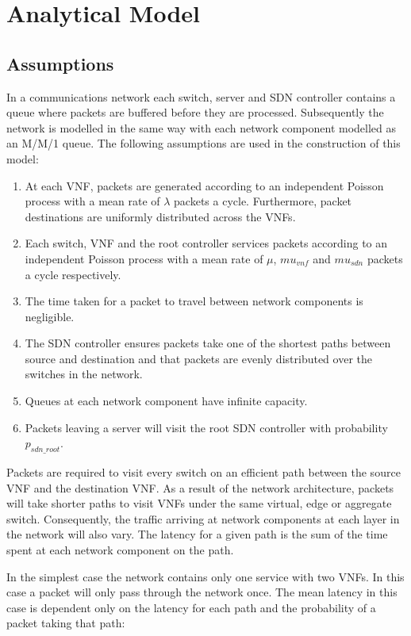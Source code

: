 
\section{Analytical Model}
\label{sec:analytical_model}

\subsection{Assumptions}
In a communications network each switch, server and SDN controller contains a queue where packets are buffered before they are processed. Subsequently the network is modelled in the same way with each network component modelled as an M/M/1 queue. The following assumptions are used in the construction of this model:

\begin{enumerate}
\item At each VNF, packets are generated according to an independent Poisson process with a mean rate of $\lambda$ packets a cycle. Furthermore, packet destinations are uniformly distributed across the VNFs.
\item Each switch, VNF and the root controller services packets according to an independent Poisson process with a mean rate of $\mu$, $mu_{vnf}$ and $mu_{sdn}$ packets a cycle respectively.
\item The time taken for a packet to travel between network components is negligible.
\item The SDN controller ensures packets take one of the shortest paths between source and destination and that packets are evenly distributed over the switches in the network.
\item Queues at each network component have infinite capacity.
\item Packets leaving a server will visit the root SDN controller with probability $p_{sdn\_root}$.
\end{enumerate}

Packets are required to visit every switch on an efficient path between the source VNF and the destination VNF. As a result of the network architecture, packets will take shorter paths to visit VNFs under the same virtual, edge or aggregate switch. Consequently, the traffic arriving at network components at each layer in the network will also vary. The latency for a given path is the sum of the time spent at each network component on the path. 

In the simplest case the network contains only one service with two VNFs. In this case a packet will only pass through the network once. The mean latency in this case is dependent only on the latency for each path and the probability of a packet taking that path:

